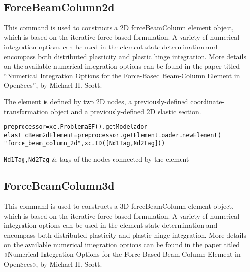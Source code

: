 \begin{methodsTable}
\ElementMeth{}
\ElementOneDMeth{}
\getVDirEjeFuerteLocales{} \\
\getVDirEjeDebilLocales{} \\
\getAnguloEjeFuerte{} \\
\getAnguloEjeDebil{} \\
\getVDirEjeFuerteGlobales{} \\
\getVDirEjeDebilGlobales{} \\

\end{methodsTable}

\subsection{ForceBeamColumn2d}
This command is used to constructs a 2D forceBeamColumn element object, which is based on the iterative force-based formulation. A variety of numerical integration options can be used in the element state determination and encompass both distributed plasticity and plastic hinge integration. More details on the available numerical integration options can be found in the paper titled ``Numerical Integration Options for the Force-Based Beam-Column Element in OpenSees'', by Michael H. Scott.

The element is defined by two 2D nodes, a previously-defined coordinate-transformation object and a previously-defined 2D elastic section.
\begin{verbatim}
preprocessor=xc.ProblemaEF().getModelador
elasticBeam2dElement=preprocessor.getElementLoader.newElement(
"force_beam_column_2d",xc.ID([Nd1Tag,Nd2Tag]))
\end{verbatim}
\begin{paramFuncTable}
{\tt Nd1Tag,Nd2Tag} & tags of the nodes connected by the element\\
\end{paramFuncTable}

\begin{paramClassTable}
\ElementParam{}
\ElementOneDParam{}
\rhoX{}
\end{paramClassTable}

\begin{methodsTable}
\ElementMeth{}
\ElementOneDMeth{}
\BeamColumnWithSectionFDMeth{}
\end{methodsTable}

\subsection{ForceBeamColumn3d}
This command is used to constructs a 3D forceBeamColumn element object, which is based on the iterative force-based formulation. A variety of numerical integration options can be used in the element state determination and encompass both distributed plasticity and plastic hinge integration. More details on the available numerical integration options can be found in the paper titled «Numerical Integration Options for the Force-Based Beam-Column Element in OpenSees», by Michael H. Scott. 


